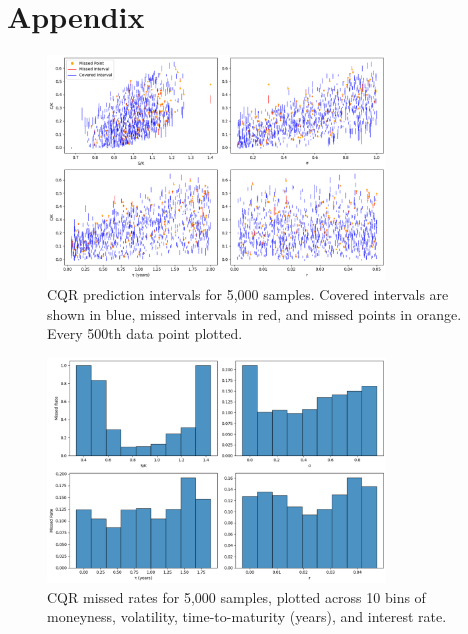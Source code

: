 \documentclass{article}
\theoremstyle{definition}
\begin{document}



\newpage

\section{Appendix}


\begin{figure}[H]
    \centering
    \includegraphics[width=0.8\textwidth]{reports/figures/3.3-nm-figures/sample_0/CQR_PIs_0.png}
    \caption{CQR prediction intervals for 5,000 samples. Covered intervals are shown in blue, missed intervals in red, and missed points in orange. Every 500th data point plotted.}
    \label{fig:CQR_PIs_0}
\end{figure}

\begin{figure}[H]
    \centering
    \includegraphics[width=0.8\textwidth]{reports/figures/3.3-nm-figures/sample_0/CQR_MISSED_RATE_0.png}
    \caption{CQR missed rates for 5,000 samples, plotted across 10 bins of moneyness, volatility, time-to-maturity (years), and interest rate.}
    \label{fig:CQR_MISSED_RATE_0}
\end{figure}
\end{document}
